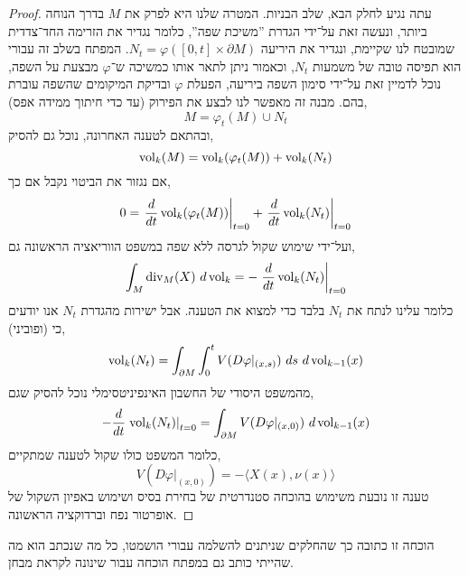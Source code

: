 \begin{proof}
	עתה נגיע לחלק הבא, שלב הבניות.
	המטרה שלנו היא לפרק את $M$ בדרך הנוחה ביותר, ונעשה זאת על־ידי הגדרת ''משיכת שפה'', כלומר נגדיר את הזרימה החד־צדדית שמובטח לנו שקיימת, ונגדיר את היריעה $N_t = \varphi([0, t] \times \partial M)$.
	המפתח בשלב זה עבורי הוא תפיסה טובה של משמעות $N_t$, וכאמור ניתן לתאר אותו כמשיכה ש־$\varphi$ מבצעת על השפה, נוכל לדמיין זאת על־ידי סימון השפה ביריעה, הפעלת $\varphi$ ובדיקת המיקומים שהשפה עוברת בהם.
	מבנה זה מאפשר לנו לבצע את הפירוק (עד כדי חיתוך ממידה אפס),
	\[
		M = \varphi_t(M) \cup N_t
	\]
	ובהתאם לטענה האחרונה, נוכל גם להסיק,
	\[
		\operatorname{vol}_k(M)
		= \operatorname{vol}_k(\varphi_t(M)) + \operatorname{vol}_k(N_t)
	\]
	אם נגזור את הביטוי נקבל אם כך,
	\[
		0 = 
		\left. \frac{d}{dt} \operatorname{vol}_k(\varphi_t(M)) \right\lvert_{t = 0}
		+ \left. \frac{d}{dt} \operatorname{vol}_k(N_t) \right\lvert_{t = 0}
	\]
	ועל־ידי שימוש שקול לגרסה ללא שפה במשפט הווריאציה הראשונה גם,
	\[
		\int_M \operatorname{div}_M(X)\ d\operatorname{vol}_k
		= - \left. \frac{d}{dt} \operatorname{vol}_k(N_t) \right\lvert_{t = 0}
	\]
	כלומר עלינו לנתח את $N_t$ בלבד כדי למצוא את הטענה.
	אבל ישירות מהגדרת $N_t$ אנו יודעים כי (ופוביני),
	\[
		\vol_k(N_t)
		= \int_{\partial M} \int_{0}^{t} V(D \varphi |_{(x, s)})\ ds\ d\vol_{k - 1}(x)
	\]
	מהמשפט היסודי של החשבון האינפיניטסימלי נוכל להסיק שגם,
	\[
		- \frac{d}{dt} \left. \operatorname{vol}_k(N_t) \right\lvert_{t = 0}
		= \int_{\partial M} V(D \varphi |_{(x, 0)})\ d\operatorname{vol}_{k - 1}(x)
	\]
	כלומר המשפט כולו שקול לטענה שמתקיים,
	\[
		V(D \varphi |_{(x, 0)}) = - \langle X(x), \nu(x) \rangle
	\]
	טענה זו נובעת משימוש בהוכחה סטנדרטית של בחירת בסיס ושימוש באפיון השקול של אופרטור נפח וברדוקציה הראשונה.
\end{proof}
הוכחה זו כתובה כך שהחלקים שניתנים להשלמה עבורי הושמטו, כל מה שנכתב הוא מה שהייתי כותב גם במפתח הוכחה עבור שינונה לקראת מבחן.

